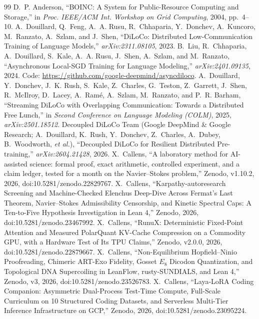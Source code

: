 \documentclass[11pt,a4paper]{article}
\begin{document}
\begin{thebibliography}{99}
\footnotesize
{} D.~P. Anderson, ``BOINC: A System for Public-Resource Computing and Storage,'' in \textit{Proc. IEEE/ACM Int. Workshop on Grid Computing}, 2004, pp.~4--10.
 A.~Douillard, Q.~Feng, A.~A. Rusu, R.~Chhaparia, Y.~Donchev, A.~Kuncoro, M.~Ranzato, A.~Szlam, and J.~Shen, ``DiLoCo: Distributed Low-Communication Training of Language Models,'' \textit{arXiv:2311.08105}, 2023.
 B.~Liu, R.~Chhaparia, A.~Douillard, S.~Kale, A.~A. Rusu, J.~Shen, A.~Szlam, and M.~Ranzato, ``Asynchronous Local-SGD Training for Language Modeling,'' \textit{arXiv:2401.09135}, 2024. Code: \url{https://github.com/google-deepmind/asyncdiloco}.
 A.~Douillard, Y.~Donchev, J.~K. Rush, S.~Kale, Z.~Charles, G.~Teston, Z.~Garrett, J.~Shen, R.~McIlroy, D.~Lacey, A.~Ram\'e, A.~Szlam, M.~Ranzato, and P.~R. Barham, ``Streaming DiLoCo with Overlapping Communication: Towards a Distributed Free Lunch,'' in \textit{Second Conference on Language Modeling (COLM)}, 2025, \textit{arXiv:2501.18512}.
 Decoupled DiLoCo Team (Google DeepMind \& Google Research; A.~Douillard, K.~Rush, Y.~Donchev, Z.~Charles, A.~Dubey, B.~Woodworth, \textit{et al.}), ``Decoupled DiLoCo for Resilient Distributed Pre-training,'' \textit{arXiv:2604.21428}, 2026.
 X.~Callens, ``A laboratory method for AI-assisted science: formal proof, exact arithmetic, controlled experiment, and a claim ledger, tested for a month on the Navier--Stokes problem,'' Zenodo, v1.10.2, 2026, doi:10.5281/zenodo.22829767.
 X.~Callens, ``Karpathy-autoresearch Screening and Machine-Checked Elenchus Deep-Dive Across Fermat's Last Theorem, Navier--Stokes Admissibility Censorship, and Kinetic Spectral Caps: A Ten-to-Five Hypothesis Investigation in Lean 4,'' Zenodo, 2026, doi:10.5281/zenodo.23467992.
 X.~Callens, ``RunuX: Deterministic Fixed-Point Attention and Measured PolarQuant KV-Cache Compression on a Commodity GPU, with a Hardware Test of Its TPU Claims,'' Zenodo, v2.0.0, 2026, doi:10.5281/zenodo.22879667.
 X.~Callens, ``Non-Equilibrium Hopfield--Ninio Proofreading, Chimeric ART-Exo Fidelity, Gosset $E_8$ Dicodon Quantization, and Topological DNA Supercoiling in LeanFlow, rusty-SUNDIALS, and Lean 4,'' Zenodo, v3, 2026, doi:10.5281/zenodo.23526783.
 X.~Callens, ``Laya-LoRA Coding Companion: Asymmetric Dual-Process Test-Time Compute, Full-Scale Curriculum on 10 Structured Coding Datasets, and Serverless Multi-Tier Inference Infrastructure on GCP,'' Zenodo, 2026, doi:10.5281/zenodo.23095224.

\end{thebibliography}
\end{document}
